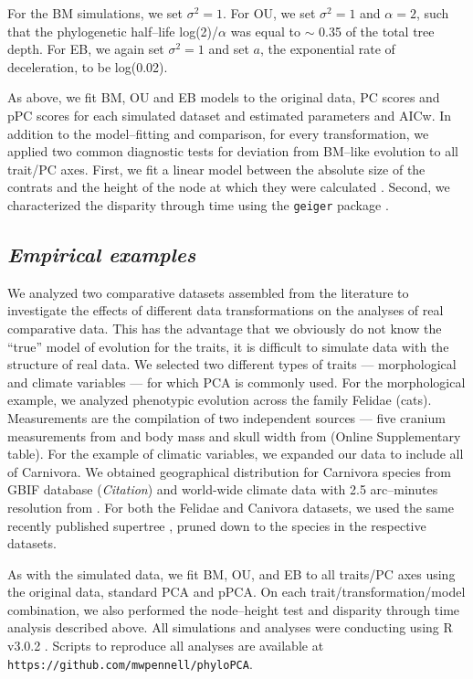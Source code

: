 \documentclass[a4paper,12pt]{article}
\begin{document}
For the BM simulations, we set $\sigma^2=\text{1}$. For OU, we set $\sigma^2=\text{1}$ and $\alpha=\text{2}$, such that the phylogenetic half--life log(2)/$\alpha$ \citep{Hansen2008} was equal to $\sim$ 0.35 of the total tree depth. For EB, we again set $\sigma^2=\text{1}$ and set $a$, the exponential rate of deceleration, to be log(0.02). 

As above, we fit BM, OU and EB models to the original data, PC scores and pPC scores for each simulated dataset and estimated parameters and AICw. In addition to the model--fitting and comparison, for every transformation, we applied two common diagnostic tests for deviation from BM--like evolution to all trait/PC axes. First, we fit a linear model between the absolute size of the contrats \citep{Felsenstein1985} and the height of the node at which they were calculated \citep[i.e., the ``node height test'' of][]{FreckletonHarvey2006}. Second, we characterized the disparity through time \citep{Harmon2003} using the \texttt{geiger} package \citep{geiger2}. 


\subsection{\emph{Empirical examples}}
We analyzed two comparative datasets assembled from the literature to investigate the effects of different data transformations on the analyses of real comparative data. This has the advantage that we obviously do not know the ``true'' model of evolution for the traits, it is difficult to simulate data with the structure of real data. We selected two different types of traits --- morphological and climate variables --- for which PCA is commonly used. For the morphological example, we analyzed phenotypic evolution across the family Felidae (cats). Measurements are the compilation of two independent sources --- five cranium measurements from \cite{slater_2009} and body mass and skull width from \cite{sakamoto_2010} (Online Supplementary table). For the example of climatic variables, we expanded our data to include all of Carnivora. We obtained geographical distribution for Carnivora species from GBIF database (\textit{Citation}) and world-wide climate data with 2.5 arc--minutes resolution from \cite{hijmans_2005}. For both the Felidae and Canivora datasets, we used the same recently published supertree \citep{Nyakatura_2012}, pruned down to the species in the respective datasets.

As with the simulated data, we fit BM, OU, and EB to all traits/PC axes using the original data, standard PCA and pPCA. On each trait/transformation/model combination, we also performed the node--height test and disparity through time analysis described above. All simulations and analyses were conducting using R v3.0.2 \citep{R}. Scripts to reproduce all analyses are available at \texttt{https://github.com/mwpennell/phyloPCA}.
\end{document}
